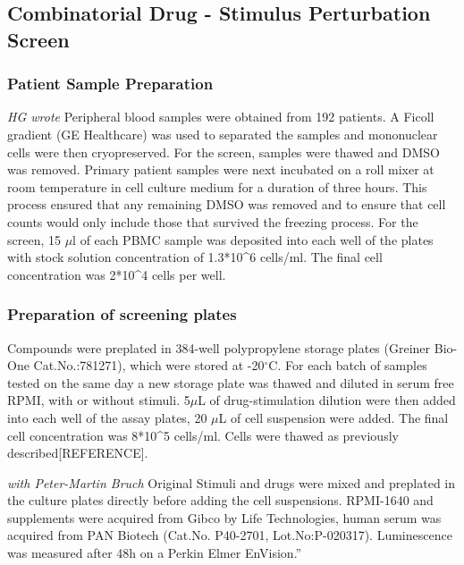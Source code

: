 \documentclass[11pt, a4paper, twosided]{book}
\begin{document}
\hypertarget{combinatorial-drug---stimulus-perturbation-screen}{%
\subsection{Combinatorial Drug - Stimulus Perturbation Screen}\label{combinatorial-drug---stimulus-perturbation-screen}}

\hypertarget{patient-sample-preparation}{%
\subsubsection{Patient Sample Preparation}\label{patient-sample-preparation}}

\emph{HG wrote}
Peripheral blood samples were obtained from 192 patients. A Ficoll gradient (GE Healthcare) was used to separated the samples and mononuclear cells were then cryopreserved. For the screen, samples were thawed and DMSO was removed. Primary patient samples were next incubated on a roll mixer at room temperature in cell culture medium for a duration of three hours. This process ensured that any remaining DMSO was removed and to ensure that cell counts would only include those that survived the freezing process. For the screen, 15 \(\mu\)l of each PBMC sample was deposited into each well of the plates with stock solution concentration of 1.3*10\^{}6 cells/ml. The final cell concentration was 2*10\^{}4 cells per well.

\hypertarget{preparation-of-screening-plates}{%
\subsubsection{Preparation of screening plates}\label{preparation-of-screening-plates}}

Compounds were preplated in 384-well polypropylene storage plates (Greiner Bio-One Cat.No.:781271), which were stored at -20\(^\circ\)C. For each batch of samples tested on the same day a new storage plate was thawed and diluted in serum free RPMI, with or without stimuli. 5\(\mu\)L of drug-stimulation dilution were then added into each well of the assay plates, 20 \(\mu\)L of cell suspension were added. The final cell concentration was 8*10\^{}5 cells/ml. Cells were thawed as previously described{[}REFERENCE{]}.

\emph{with Peter-Martin Bruch} Original
Stimuli and drugs were mixed and preplated in the culture plates directly before adding the cell suspensions. RPMI-1640 and supplements were acquired from Gibco by Life Technologies, human serum was acquired from PAN Biotech (Cat.No. P40-2701, Lot.No:P-020317). Luminescence was measured after 48h on a Perkin Elmer EnVision.''
\end{document}
